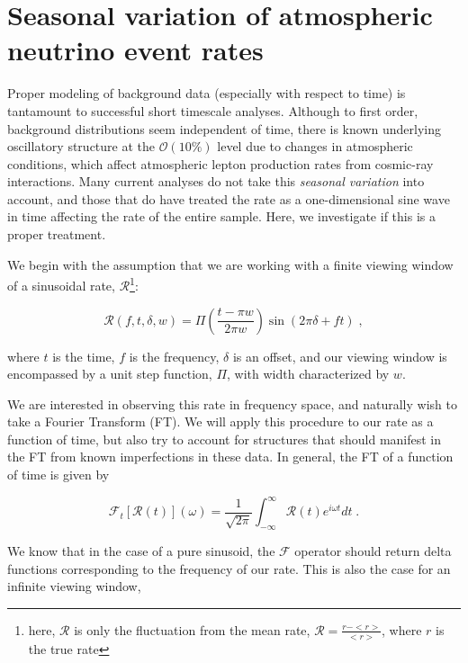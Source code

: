 \chapter{Seasonal variation of atmospheric neutrino event rates}
\label{sec:seasonal}

Proper modeling of background data (especially with respect to time) is tantamount to successful short timescale analyses. Although to first order, background distributions seem independent of time, there is known underlying oscillatory structure at the $\mathcal{O}(10\%)$ level due to changes in atmospheric conditions, which affect atmospheric lepton production rates from cosmic-ray interactions. Many current analyses do not take this \textit{seasonal variation} into account, and those that do have treated the rate as a one-dimensional sine wave in time affecting the rate of the entire sample. Here, we investigate if this is a proper treatment. 

We begin with the assumption that we are working with a finite viewing window of a sinusoidal rate, $\mathcal{R}$\footnote{here, $\mathcal{R}$ is only the fluctuation from the mean rate, $\mathcal{R} = \frac{r-<r>}{<r>}$, where $r$ is the true rate}:

\begin{equation}
\label{eq:rate}
    \mathcal{R}(f,t,\delta, w) = \Pi \left(\frac{t-\pi  w}{2 \pi  w}\right) \sin (2 \pi  \delta +f t) \; , 
\end{equation}

where $t$ is the time, $f$ is the frequency, $\delta$ is an offset, and our viewing window is encompassed by a unit step function, $\Pi$, with width characterized by $w$. 

We are interested in observing this rate in frequency space, and naturally wish to take a Fourier Transform (FT). We will apply this procedure to our rate as a function of time, but also try to account for structures that should manifest in the FT from known imperfections in these data. In general, the FT of a function of time is given by

\begin{equation}
\label{eq:FFT}
    \mathcal{F}_t[\mathcal{R}(t)](\omega ) = \frac{1}{\sqrt{2 \pi}} \int_{-\infty}^{\infty} \mathcal{R}(t) e^{i \omega t} d t \; .
\end{equation}

We know that in the case of a pure sinusoid, the $\mathcal{F}$ operator should return delta functions corresponding to the frequency of our rate. This is also the case for an infinite viewing window,

